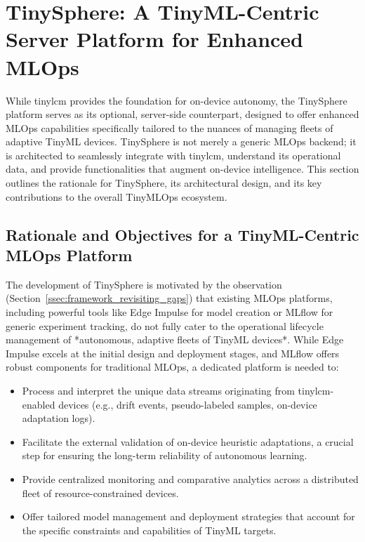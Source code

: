 \section{TinySphere: A TinyML-Centric Server Platform for Enhanced MLOps}
\label{sec:tinysphere_detailed_design}

While \gls{tinylcm} provides the foundation for on-device autonomy, the TinySphere platform serves as its optional, server-side counterpart, designed to offer enhanced MLOps capabilities specifically tailored to the nuances of managing fleets of adaptive TinyML devices. TinySphere is not merely a generic MLOps backend; it is architected to seamlessly integrate with \gls{tinylcm}, understand its operational data, and provide functionalities that augment on-device intelligence. This section outlines the rationale for TinySphere, its architectural design, and its key contributions to the overall TinyMLOps ecosystem.

\subsection{Rationale and Objectives for a TinyML-Centric MLOps Platform}
\label{ssec:tinysphere_rationale}

The development of TinySphere is motivated by the observation (Section~\ref{ssec:framework_revisiting_gaps}) that existing MLOps platforms, including powerful tools like Edge Impulse for model creation or MLflow for generic experiment tracking, do not fully cater to the operational lifecycle management of *autonomous, adaptive fleets of TinyML devices*. While Edge Impulse excels at the initial design and deployment stages, and MLflow offers robust components for traditional MLOps, a dedicated platform is needed to:

\begin{itemize}
    \item Process and interpret the unique data streams originating from \gls{tinylcm}-enabled devices (e.g., drift events, pseudo-labeled samples, on-device adaptation logs).
    \item Facilitate the external validation of on-device heuristic adaptations, a crucial step for ensuring the long-term reliability of autonomous learning.
    \item Provide centralized monitoring and comparative analytics across a distributed fleet of resource-constrained devices.
    \item Offer tailored model management and deployment strategies that account for the specific constraints and capabilities of TinyML targets.
\end{itemize}

